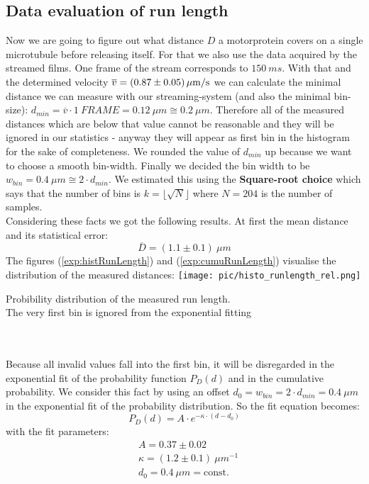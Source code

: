     \subsection{Data evaluation of run length}
    	Now we are going to figure out what distance $D$ a motorprotein covers on a single microtubule before releasing itself. For that we also use the data acquired by the streamed films. One frame of the stream corresponds to $150\ \unit{ms}$. With that and the determined velocity $\overline v = \unit[(0.87 \pm 0.05)]{\mu m/s}$ we can calculate the minimal distance we can measure with our streaming-system (and also the minimal bin-size): $d_{min} = \overline{v} \cdot 1\ \unit{FRAME} = 0.12\ \unit{\mu m} \cong 0.2\ \unit{\mu m}$. Therefore all of the measured distances which are below that value cannot be reasonable and they will be ignored in our statistics - anyway they will appear as first bin in the histogram for the sake of completeness. We rounded the value of $d_{min}$ up because we want to choose a smooth bin-width. Finally we decided the bin width to be $w_{bin} = 0.4\ \unit{\mu m} \cong 2 \cdot {d_{min}}$. We estimated this using the \textbf{Square-root choice}\cite{wikiHisto} which says that the number of bins is $k = \lfloor\sqrt{N}\rfloor$ where $N = 204$ is the number of samples.\\
    	Considering these facts we got the following results. At first the mean distance and its statistical error:
    	\begin{equation*}
    		\overline{D} = (1.1 \pm 0.1)\ \unit{\mu m}
    	\end{equation*}
    	The figures (\ref{exp:histRunLength}) and  (\ref{exp:cumuRunLength}) visualise the distribution of the measured distances:
    	 \minipanf
    	 	\centering
    	 	\captionsetup{justification=centering,margin=2cm}
    	 		\texttt{[image: pic/histo\_runlength\_rel.png]}
    	 	\caption{Probibility distribution of the measured run length.\\ The very first bin is ignored from the exponential fitting}
    	 	\label{exp:histRunLength}
    	 \minipend\\
    	 \ \\   
    	 Because all invalid values fall into the first bin, it will be disregarded in the exponential fit of the probability function $P_D(d)$ and in the cumulative probability. We consider this fact by using an offset $d_0 = w_{bin} = 2 \cdot d_{min} = 0.4\ \unit{\mu m}$ in the exponential fit of the probability distribution. So the fit equation becomes:
    	 \begin{equation*}
    	 	P_D(d) = A \cdot e^{-\kappa\cdot(d-d_0)}
    	 \end{equation*}
    	 with the fit parameters:
    	 \begin{align*}
    	  	&A = 0.37 \pm 0.02\\
    	  	&\kappa = (1.2 \pm 0.1)\ \unit{\mu m^{-1}}\\
    	  	&d_0 = 0.4\ \unit{\mu m}= \mathrm{const.}
    	 \end{align*}
    	 
